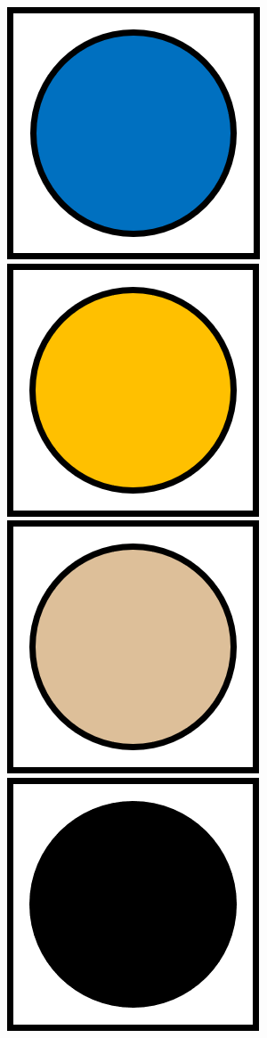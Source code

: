 \documentclass[12pt,a4paper,openright]{book}
\theoremstyle{break}
\begin{document}
\begin{center}
\includegraphics[scale=0.65]{blueCube.png}
\includegraphics[scale=0.65]{orangeCube.png}
\includegraphics[scale=0.65]{beigeCube.png}
\includegraphics[scale=0.65]{blackCube.png}

\end{center}
\end{document}
